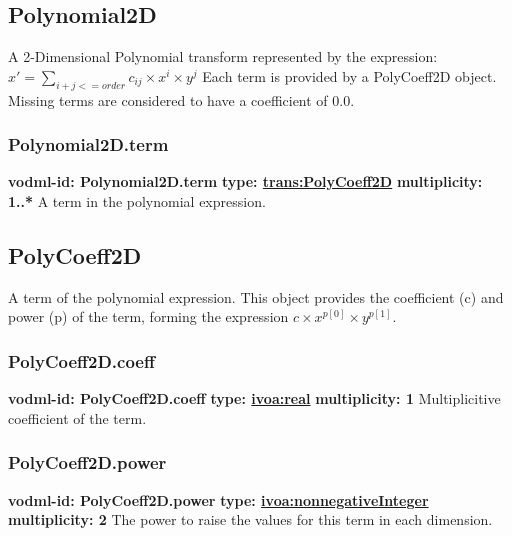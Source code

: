   \subsection{Polynomial2D}
  \label{sect:Polynomial2D}
    A 2-Dimensional Polynomial transform represented by the expression:
    \indent $x' = \sum_{i+j<=order} c_{ij}\times x^{i}\times y^{j}$ \newline
    Each term is provided by a PolyCoeff2D object. Missing terms are considered to have a coefficient of 0.0.

    \subsubsection{Polynomial2D.term}
      \textbf{vodml-id: Polynomial2D.term} \newline
      \textbf{type: \hyperref[sect:PolyCoeff2D]{trans:PolyCoeff2D}} \newline
      \textbf{multiplicity: 1..*} \newline 
      A term in the polynomial expression.

  \subsection{PolyCoeff2D}
  \label{sect:PolyCoeff2D}
    A term of the polynomial expression. This object provides the coefficient (c) and power (p) of the term, forming the expression $c \times x^{p[0]} \times y^{p[1]}$.

    \subsubsection{PolyCoeff2D.coeff}
      \textbf{vodml-id: PolyCoeff2D.coeff} \newline
      \textbf{type: \hyperref[sect:ivoa]{ivoa:real}} \newline
      \textbf{multiplicity: 1} \newline 
      Multiplicitive coefficient of the term.

    \subsubsection{PolyCoeff2D.power}
      \textbf{vodml-id: PolyCoeff2D.power} \newline
      \textbf{type: \hyperref[sect:ivoa]{ivoa:nonnegativeInteger}} \newline
      \textbf{multiplicity: 2} \newline 
      The power to raise the values for this term in each dimension.

